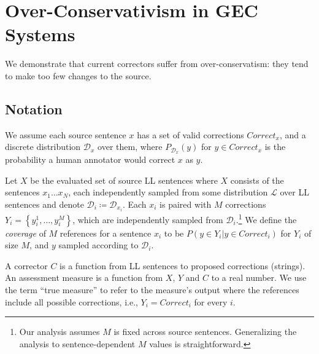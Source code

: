 \documentclass[letter,11pt]{article}
\begin{document}
\section{Over-Conservativism in GEC Systems}\label{sec:formal_conservatism}
%
%
We demonstrate that current correctors
suffer from over-conservatism: they tend to make too few changes to the source.
\subsection{Notation}
We assume each source sentence $x$ has a set of valid corrections $Correct_x$,
and a discrete distribution $\mathcal{D}_x$ over them, where $P_{\mathcal{D}_x}(y)$
for $y \in Correct_x$ is the probability a human annotator would correct $x$ as $y$.

Let $X$ be the evaluated set of source LL sentences where $X$ consists of the sentences $x_{1}\ldots x_N$, each independently sampled from some distribution $\mathcal{L}$ over LL sentences and denote $\mathcal{D}_{i}\coloneqq \mathcal{D}_{x_i}$.
Each $x_i$ is paired with $M$ corrections $Y_i = \left\{y_{i}^{1},\ldots, y_{i}^{M}\right\}$,
which are independently sampled from $\mathcal{D}_{i}$.\footnote{Our analysis assumes $M$
	is fixed across source sentences. Generalizing the analysis to sentence-dependent $M$
	values is straightforward.}
We define the {\it coverage} of $M$ references for a sentence $x_i$ to be
$P(y \in Y_i|y \in Correct_i)$ for $Y_i$ of size $M$, and $y$ sampled
according to $\mathcal{D}_i$.

A corrector $C$ is a function from LL sentences to proposed corrections (strings).
An assessment measure is a function from $X$, $Y$ and $C$ to
a real number. We use the term ``true measure'' to refer to the measure's output where the references include all possible corrections, i.e., $Y_i=Correct_i$ for every $i$.
\end{document}
